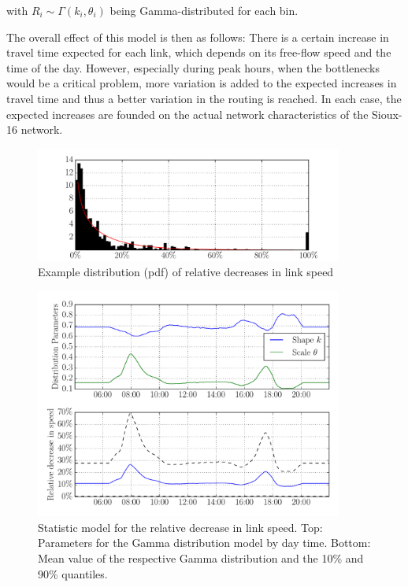 with $R_i \sim \Gamma(k_i, \theta_i)$ being Gamma-distributed for each bin.

The overall effect of this model is then as follows: There is a certain increase
in travel time expected for each link, which depends on its free-flow speed and the time
of the day. However, especially during peak hours, when the bottlenecks would be a
critical problem, more variation is added to the expected increases in travel time
and thus a better variation in the routing is reached. In each case, the expected
increases are founded on the actual network characteristics of the Sioux-16 network.


\begin{figure}
    \centering
    \includegraphics[width=0.9\textwidth]{figures/speeddecdist.pdf}
    \caption{Example distribution (pdf) of relative decreases in link speed}
    \label{fig:speeddecdist}
\end{figure}

\begin{figure}
    \centering
    \includegraphics[width=0.9\textwidth]{figures/randommodel.pdf}
    \caption{Statistic model for the relative decrease in link speed. Top: Parameters
    for the Gamma distribution model by day time. Bottom: Mean value of the respective
    Gamma distribution and the 10\% and 90\% quantiles.}
    \label{fig:randommodel}
\end{figure}

